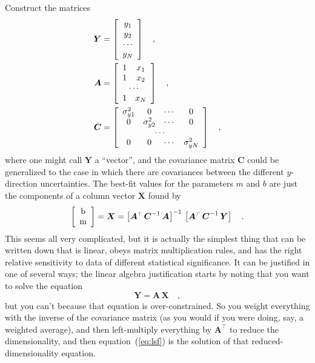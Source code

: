 \documentclass[12pt,twoside]{article}
\newcommand{\equationname}{equation}
\newcommand{\mmatrix}[1]{\boldsymbol{#1}}
\newcommand{\inverse}[1]{{#1}^{-1}}
\newcommand{\transpose}[1]{{#1}^{\scriptscriptstyle \top}}
\newcommand{\mA}{\mmatrix{A}}
\newcommand{\mAT}{\transpose{\mA}}
\newcommand{\mC}{\mmatrix{C}}
\newcommand{\mCinv}{\inverse{\mC}}
\newcommand{\mX}{\mmatrix{X}}
\newcommand{\mY}{\mmatrix{Y}}
\begin{document}
Construct the matrices
\begin{align}\label{eq:mY}
\mY &= \left[\begin{array}{c}
y_1 \\
y_2 \\
\cdots \\
y_N
\end{array}\right] \quad ,\\
\mA &= \left[\begin{array}{cc}
1 & x_1 \\
1 & x_2 \\
\multicolumn{2}{c}{\cdots} \\
1 & x_N
\end{array}\right] \quad ,\\
\mC & = \left[\begin{array}{cccc}
\sigma_{y1}^{2} & 0 & \cdots & 0 \\
0 & \sigma_{y2}^{2} & \cdots & 0 \\
\multicolumn{4}{c}{\cdots} \\
0 & 0 & \cdots & \sigma_{yN}^{2}
\end{array}\right] \quad ,\label{eq:covar}
\end{align}
where one might call $\mY$ a ``vector'', and the covariance matrix
$\mC$ could be generalized to the case in which there are covariances
between the different $y$-direction uncertainties.  The best-fit
values for the parameters $m$ and $b$ are just the components of a
column vector $\mX$ found by
\begin{equation}\label{eq:lsf}
\left[\begin{array}{c} $b$ \\ $m$ \end{array}\right]
 = \mX = \inverse{\left[\mAT\,\mCinv\,\mA\right]}
  \,\left[\mAT\,\mCinv\,\mY\right] \quad .
\end{equation}
This seems all very complicated, but it is actually the simplest thing
that can be written down that is linear, obeys matrix multiplication
rules, and has the right relative sensitivity to data of different
statistical significance.  It can be justified in one of several ways;
the linear algebra justification starts by noting that you want to
solve the equation
\begin{equation}
\mY = \mA\,\mX \quad ,
\end{equation}
but you can't because that equation is over-constrained.  So you
weight everything with the inverse of the covariance matrix (as you
would if you were doing, say, a weighted average), and then
left-multiply everything by $\mAT$ to reduce the dimensionality, and
then \equationname~(\ref{eq:lsf}) is the solution of that
reduced-dimensionality equation.
\end{document}

